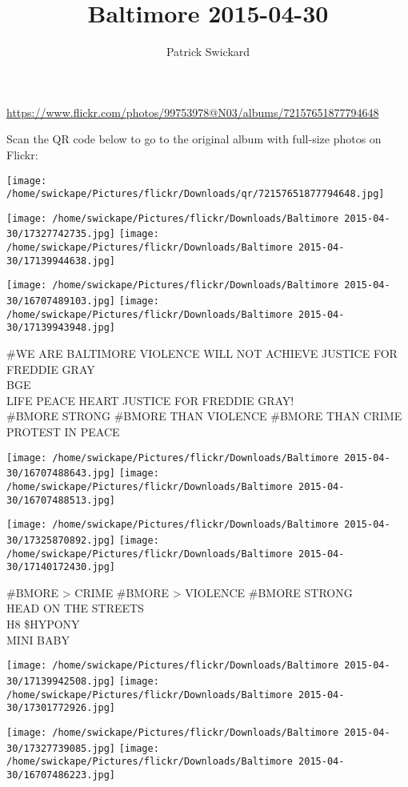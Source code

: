 \documentclass[10pt,letterpaper]{article}
\title{Baltimore 2015-04-30}
\author{Patrick Swickard}
\date{}
\begin{document}
\maketitle

\url{https://www.flickr.com/photos/99753978@N03/albums/72157651877794648}

Scan the QR code below to go to the original album with full-size photos on Flickr:

\texttt{[image: /home/swickape/Pictures/flickr/Downloads/qr/72157651877794648.jpg]}
\pagebreak

\texttt{[image: /home/swickape/Pictures/flickr/Downloads/Baltimore 2015-04-30/17327742735.jpg]}
\texttt{[image: /home/swickape/Pictures/flickr/Downloads/Baltimore 2015-04-30/17139944638.jpg]}

\texttt{[image: /home/swickape/Pictures/flickr/Downloads/Baltimore 2015-04-30/16707489103.jpg]}
\texttt{[image: /home/swickape/Pictures/flickr/Downloads/Baltimore 2015-04-30/17139943948.jpg]}

\#WE ARE BALTIMORE VIOLENCE WILL NOT ACHIEVE JUSTICE FOR FREDDIE GRAY\\
BGE\\
LIFE PEACE HEART JUSTICE FOR FREDDIE GRAY!\\
\#BMORE STRONG \#BMORE THAN VIOLENCE \#BMORE THAN CRIME PROTEST IN PEACE
\pagebreak

\texttt{[image: /home/swickape/Pictures/flickr/Downloads/Baltimore 2015-04-30/16707488643.jpg]}
\texttt{[image: /home/swickape/Pictures/flickr/Downloads/Baltimore 2015-04-30/16707488513.jpg]}

\texttt{[image: /home/swickape/Pictures/flickr/Downloads/Baltimore 2015-04-30/17325870892.jpg]}
\texttt{[image: /home/swickape/Pictures/flickr/Downloads/Baltimore 2015-04-30/17140172430.jpg]}

\#BMORE > CRIME \#BMORE > VIOLENCE \#BMORE STRONG\\
HEAD ON THE STREETS\\
H8 \$HYPONY\\
MINI BABY
\pagebreak

\texttt{[image: /home/swickape/Pictures/flickr/Downloads/Baltimore 2015-04-30/17139942508.jpg]}
\texttt{[image: /home/swickape/Pictures/flickr/Downloads/Baltimore 2015-04-30/17301772926.jpg]}

\texttt{[image: /home/swickape/Pictures/flickr/Downloads/Baltimore 2015-04-30/17327739085.jpg]}
\texttt{[image: /home/swickape/Pictures/flickr/Downloads/Baltimore 2015-04-30/16707486223.jpg]}
\end{document}
